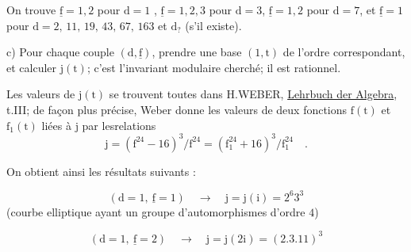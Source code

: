 On trouve $\underline{\mathrm{f}}=1,2$ pour $\mathrm{d}=1$ , $\underline{\mathrm{f}}=1,2,3$ pour $\mathrm{d}=3$, $\underline{\mathrm{f}}=1,2$ pour $\mathrm{d}=7$, et $\underline{\mathrm{f}}=1$ pour $\mathrm{d}=2,\,11,\,19,\,43,\,67,\,163$ et $\mathrm{d}_{?}$ (s'il existe).

c) Pour chaque couple $(\mathrm{d},\underline{\mathrm{f}})$, prendre une base $(1,\mathrm{t})$ de l'ordre correspondant, et calculer $\mathrm{j}(\mathrm{t})$; c'est l'invariant modulaire cherché; il est rationnel.

Les valeurs de $\mathrm{j}(\mathrm{t})$ se trouvent toutes dans H.WEBER, \uline{Lehrbuch der Algebra}, t.III; de façon plus précise, Weber donne les valeurs de deux fonctions $\mathrm{f}(\mathrm{t})$ et $\mathrm{f}_{1}(\mathrm{t})$ liées à $\mathrm{j}$ par lesrelations
\[
\mathrm{j}=(\mathrm{f}^{24}-16)^{3}/\mathrm{f}^{24}
       =(\mathrm{f}_{1}^{24}+16)^{3}/\mathrm{f}_{1}^{24}\quad .
\]

On obtient ainsi les résultats suivants :

\begingroup
\makeatletter\tagsleft@true\makeatother
\[
(\mathrm{d}=1,\ \underline{\mathrm{f}}=1)\quad \rightarrow\quad
\mathrm{j}=\mathrm{j}(\mathrm{i})=2^{6}3^{3}
\tag*{1.1.}
\]
(courbe elliptique ayant un groupe d'automorphismes d'ordre $4$)

\[
(\mathrm{d}=1,\ \underline{\mathrm{f}}=2)\quad \rightarrow\quad
\mathrm{j}=\mathrm{j}(2\mathrm{i})=(2.3.11)^{3}
\tag*{1.2}
\]
\endgroup
\clearpage
{}
\reversemarginpar
{}
\normalmarginpar
{}

